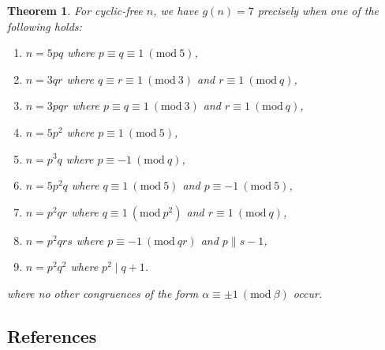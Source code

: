 \documentclass{article}
\newcommand{\Mod}[1]{\ (\mathrm{mod} \ #1)}
\theoremstyle{plain}
\newtheorem{thm}{Theorem}[section]
\theoremstyle{definition}
\begin{document}
\begin{thm}
	For cyclic-free $n$, we have $g(n) = 7$ precisely when one of the following holds:
	\begin{enumerate}	\listspace
		\item $n = 5pq$ where $p \equiv q \equiv 1 \Mod{5}$,
		\item $n = 3qr$ where $q \equiv r \equiv 1 \Mod{3}$ and $r \equiv 1 \Mod{q}$,
		\item $n = 3pqr$ where $p \equiv q \equiv 1 \Mod{3}$ and $r \equiv 1 \Mod{q}$,
		\item $n = 5p^2$ where $p \equiv 1 \Mod{5}$,
		\item $n = p^3 q$ where $p \equiv -1 \Mod{q}$,
		\item $n = 5p^2 q$ where $q \equiv 1 \Mod{5}$ and $p \equiv -1 \Mod{5}$,
		\item $n = p^2 q r$ where $q \equiv 1 \Mod{p^2}$ and $r \equiv 1 \Mod{q}$,
		\item $n = p^2 q r s$ where $p \equiv -1 \Mod{qr}$ and $p \parallel s - 1$,
		\item $n = p^2 q^2$ where $p^2 \mid q + 1$.
	\end{enumerate} \textspace
	where no other congruences of the form $\alpha \equiv \pm 1 \Mod{\beta}$ \nolinebreak[4] \mbox{occur}.
\end{thm}

\begin{center}\section*{References}\end{center}
\printbibliography[heading=none]
\end{document}
